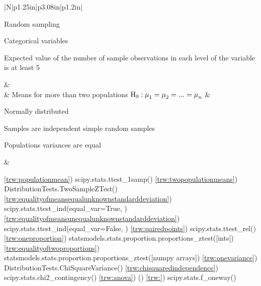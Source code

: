 \begin{longtable}{|N|p{1.25in}|p{3.08in}|p{1.2in}|}
				\begin{nospacebulletedlist}
					\item Random sampling
					\item Categorical variables
					\item Expected value of the number of sample observations in each level of the variable is at least 5
				\end{nospacebulletedlist} &
				 \\ \hline
			\label{trw:anova} &
				Means for more than two populations \newline$\mbox{$\textrm{H}_0$} : \mbox{$\mu$}_1 = \mbox{$\mu$}_2 = ...\hspace*{0.5pt} = \mbox{$\mu$}_n$ \vspace*{1pt} &
				\begin{nospacebulletedlist}
					\item Normally distributed
					\item Samples are independent simple random samples
					\item Populations variances are equal
				\end{nospacebulletedlist} &
				 \\ \hline
        \end{longtable}



	\begin{code}{}
		\codeitem \ref{trw:populationmean}) scipy.stats.ttest\_1samp(\arguments)
		\codeitem \ref{trw:twopopulationmeans}) DistributionTests.TwoSampleZTest(\arguments)
		\codeitem \ref{trw:equalityofmeansequalunknownstandarddeviation}) scipy.stats.ttest\_ind(equal\_var=True, \arguments)
		\codeitem \ref{trw:equalityofmeansunequalunknownstandarddeviation}) scipy.stats.ttest\_ind(equal\_var=False, \arguments)
		\codeitem \ref{trw:pairedpoints}) scipy.stats.ttest\_rel(\arguments)
		\codeitem \ref{trw:oneproportion}) statsmodels.stats.proportion.proportions\_ztest([ints])
		\codeitem \ref{trw:equalityoftwoproportions}) statsmodels.stats.proportion.proportions\_ztest([numpy arrays])
		\codeitem \ref{trw:onevariance}) DistributionTests.ChiSquareVariance(\arguments)
		\codeitem \ref{trw:chisquaredindependence}) scipy.stats.chi2\_contingency(\arguments)
		\codeitem \ref{trw:anova}) (\arguments)
		\codeitem \ref{trw:}) scipy.stats.f\_oneway(\arguments)
	\end{code} 